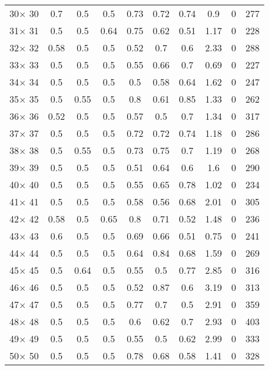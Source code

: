 \documentclass[main.tex]{subfiles}
\begin{document}
\begin{table}
\begin{tabular}{|c|c|c|c|c|c|c|c|c|c|}
30$\times$ 30 &0.7 &0.5 &0.5 &0.73 &0.72 &0.74 &0.9 &0 &277\\
31$\times$ 31 &0.5 &0.5 &0.64 &0.75 &0.62 &0.51 &1.17 &0 &228\\
32$\times$ 32 &0.58 &0.5 &0.5 &0.52 &0.7 &0.6 &2.33 &0 &288\\
33$\times$ 33 &0.5 &0.5 &0.5 &0.55 &0.66 &0.7 &0.69 &0 &227\\
34$\times$ 34 &0.5 &0.5 &0.5 &0.5 &0.58 &0.64 &1.62 &0 &247\\
35$\times$ 35 &0.5 &0.55 &0.5 &0.8 &0.61 &0.85 &1.33 &0 &262\\
36$\times$ 36 &0.52 &0.5 &0.5 &0.57 &0.5 &0.7 &1.34 &0 &317\\
37$\times$ 37 &0.5 &0.5 &0.5 &0.72 &0.72 &0.74 &1.18 &0 &286\\
38$\times$ 38 &0.5 &0.55 &0.5 &0.73 &0.75 &0.7 &1.19 &0 &268\\
39$\times$ 39 &0.5 &0.5 &0.5 &0.51 &0.64 &0.6 &1.6 &0 &290\\
40$\times$ 40 &0.5 &0.5 &0.5 &0.55 &0.65 &0.78 &1.02 &0 &234\\
41$\times$ 41 &0.5 &0.5 &0.5 &0.58 &0.56 &0.68 &2.01 &0 &305\\
42$\times$ 42 &0.58 &0.5 &0.65 &0.8 &0.71 &0.52 &1.48 &0 &236\\
43$\times$ 43 &0.6 &0.5 &0.5 &0.69 &0.66 &0.51 &0.75 &0 &241\\
44$\times$ 44 &0.5 &0.5 &0.5 &0.64 &0.84 &0.68 &1.59 &0 &269\\
45$\times$ 45 &0.5 &0.64 &0.5 &0.55 &0.5 &0.77 &2.85 &0 &316\\
46$\times$ 46 &0.5 &0.5 &0.5 &0.52 &0.87 &0.6 &3.19 &0 &313\\
47$\times$ 47 &0.5 &0.5 &0.5 &0.77 &0.7 &0.5 &2.91 &0 &359\\
48$\times$ 48 &0.5 &0.5 &0.5 &0.6 &0.62 &0.7 &2.93 &0 &403\\
49$\times$ 49 &0.5 &0.5 &0.5 &0.55 &0.5 &0.62 &2.99 &0 &333\\
50$\times$ 50 &0.5 &0.5 &0.5 &0.78 &0.68 &0.58 &1.41 &0 &328\\
    \hline
    \end{tabular}
\end{table}
\end{document}
